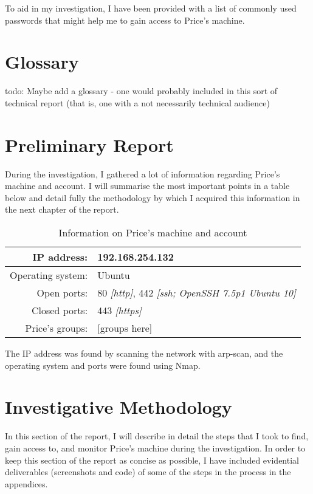 \documentclass[12pt]{report}
\begin{document}
To aid in my investigation, I have been provided with a list of commonly used passwords that might help me to gain access to Price's machine.


\pagebreak
\chapter{Glossary}
todo: Maybe add a glossary - one would probably included in this sort of technical report (that is, one with a not necessarily technical audience)


\pagebreak
\chapter{Preliminary Report}
During the investigation, I gathered a lot of information regarding Price's machine and account. I will summarise the most important points in a table below and detail fully the methodology by which I acquired this information in the next chapter of the report.

\begin{table}[h!]
  \centering
  \begin{tabular}{|r l|}
    \hline
    IP address: & 192.168.254.132 \\
    \hline
    Operating system: & Ubuntu \\
    \hline
    Open ports: & 80 \textit{[http]}, 442 \textit{[ssh; OpenSSH 7.5p1 Ubuntu 10]} \\
    \hline
    Closed ports: & 443 \textit{[https]} \\
    \hline
    Price's groups: & [groups here] \\
    \hline
  \end{tabular}
  \caption{Information on Price's machine and account}
  \label{table:pricemachineinfo}
\end{table}

The IP address was found by scanning the network with arp-scan, and the operating system and ports were found using Nmap.


\pagebreak
\chapter{Investigative Methodology}
In this section of the report, I will describe in detail the steps that I took to find, gain access to, and monitor Price's machine during the investigation. In order to keep this section of the report as concise as possible, I have included evidential deliverables (screenshots and code) of some of the steps in the process in the appendices.
\end{document}
